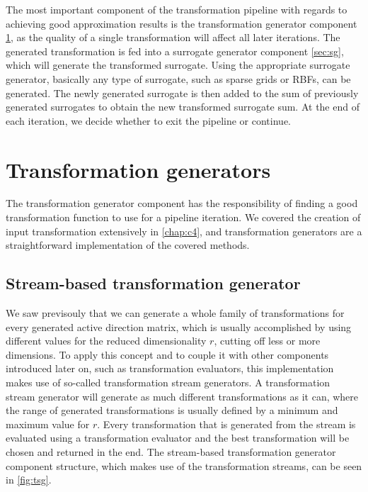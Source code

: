 \documentclass[
  a4paper,  %
  twoside,  %
  bibliography=totoc,
  headsepline,
  cleardoublepage=empty,
  parskip=half,
  draft=false
]{scrbook}
\begin{document}
%
The most important component of the transformation pipeline with regards to achieving good approximation results is the transformation generator component \cref{sec:tg}, as the quality of a single transformation will affect all later iterations.
The generated transformation is fed into a surrogate generator component \cref{sec:sg}, which will generate the transformed surrogate.
Using the appropriate surrogate generator, basically any type of surrogate, such as sparse grids or RBFs, can be generated.
The newly generated surrogate is then added to the sum of previously generated surrogates to obtain the new transformed surrogate sum.
At the end of each iteration, we decide whether to exit the pipeline or continue.


\newpage
\section {Transformation generators}
\label{sec:tg}

The transformation generator component has the responsibility of finding a good transformation function to use for a pipeline iteration.
We covered the creation of input transformation extensively in \cref{chap:c4}, and transformation generators are a straightforward implementation of the covered methods.

\subsection {Stream-based transformation generator}
\label{sec:tsg}

We saw previsouly that we can generate a whole family of transformations for every generated active direction matrix, which is usually accomplished by using different values for the reduced dimensionality $r$, \ie cutting off less or more dimensions.
To apply this concept and to couple it with other components introduced later on, such as transformation evaluators, this implementation makes use of so-called transformation stream generators.
A transformation stream generator will generate as much different transformations as it can, where the range of generated transformations is usually defined by a minimum and maximum value for $r$.
Every transformation that is generated from the stream is evaluated using a transformation evaluator and the best transformation will be chosen and returned in the end.
The stream-based transformation generator component structure, which makes use of the transformation streams, can be seen in \cref{fig:tsg}.
\end{document}
